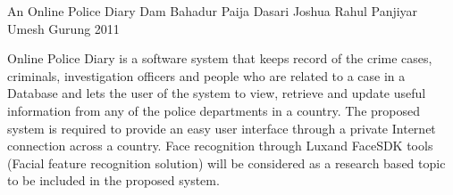  \begin{conf-abstract}[]
{An Online Police Diary}
{ Dam Bahadur Paija
  Dasari Joshua
  Rahul Panjiyar
  Umesh Gurung 
}
{ 2011 }

      Online Police Diary is a software system that keeps record of the crime cases, criminals, investigation officers and people who are related to a case in a Database and lets the user of the system to view, retrieve and update useful information from any of the police departments in a country. The proposed system is required to provide an easy user interface through a private Internet connection across a country. Face recognition through Luxand FaceSDK tools (Facial feature recognition solution) will be considered as a research based topic to be included in the proposed system. 
  \end{conf-abstract}